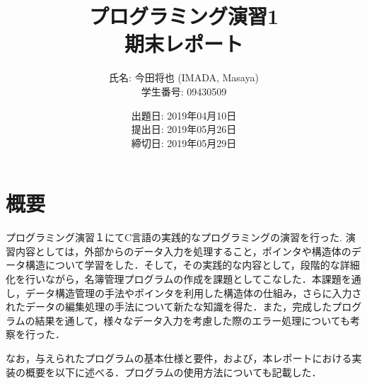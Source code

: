 \documentclass[a4j,11pt]{jarticle}
\title{プログラミング演習1 \\
       期末レポート}
\author{氏名: 今田将也 (IMADA, Masaya) \\
        学生番号: 09430509}
\date{出題日: 2019年04月10日 \\
      提出日: 2019年05月26日 \\
      締切日: 2019年05月29日 \\}  %
\begin{document}
\maketitle



\section{概要}\label{sec:gaiyou}

プログラミング演習１にてC言語の実践的なプログラミングの演習を行った. 
演習内容としては，外部からのデータ入力を処理すること，ポインタや構造体のデータ構造について学習をした．そして，その実践的な内容として，段階的な詳細化を行いながら，名簿管理プログラムの作成を課題としてこなした．本課題を通し，データ構造管理の手法やポインタを利用した構造体の仕組み，さらに入力されたデータの編集処理の手法について新たな知識を得た．また，完成したプログラムの結果を通して，様々なデータ入力を考慮した際のエラー処理についても考察を行った．

なお，与えられたプログラムの基本仕様と要件，および，本レポートにおける実装の概要を以下に述べる．プログラムの使用方法についても記載した．
\end{document}
